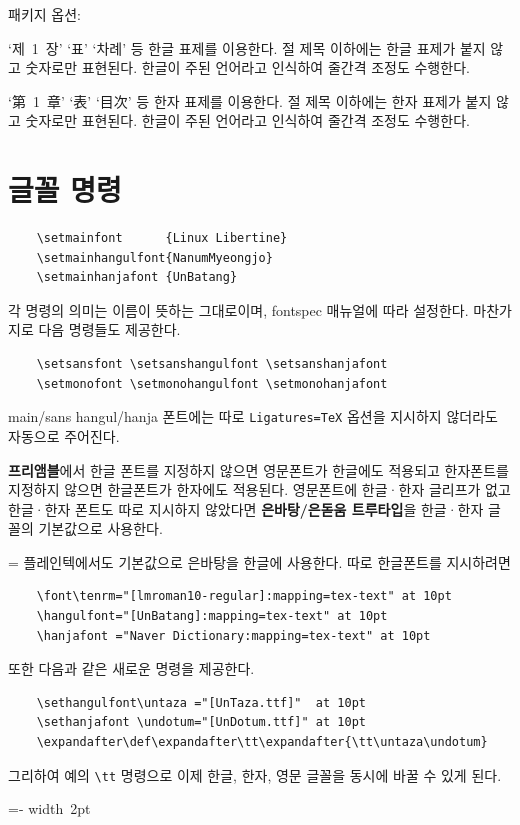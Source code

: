 \documentclass[a4paper]{article}
\def\grayvrule{{\color{white!80!black}\vrule width 2pt}}
\newenvironment{plaintex}
  {\par\medskip
    \setbox0=\vbox\bgroup\kern5pt\leftskip15pt \small
    \parindent0pt }
  {\par \kern5pt\egroup
    \dimen0=\dimexpr\pagegoal-\pagetotal\relax
    \ifdim\dimen0<\baselineskip\relax \dimen0\maxdimen \fi
    \ifdim\ht0<\dimen0
      \hbox{\grayvrule \box0}%
    \else
      \setbox2=\vsplit0 to\dimen0
      \lineskip0pt
      \ifvoid2 \else\hbox{\grayvrule \box2}\fi
      \ifvoid0 \else\hbox{\grayvrule \box0}\fi
    \fi \par\smallskip
  }
\def\cs#1{\texttt{\textbackslash #1}}
\def\hemph#1{\textsf{\bfseries #1}}
\begin{document}
패키지 옵션:
\begin{description}\hangulquotes
\item[ hangul ] `제~1~장' `표' `차례' 등 한글 표제를 이용한다.
  절 제목 이하에는 한글 표제가 붙지 않고 숫자로만 표현된다.
  한글이 주된 언어라고 인식하여 줄간격 조정도 수행한다.
\item[ hanja ]  `第~1~章' `表' `目次' 등 한자 표제를 이용한다.
  절 제목 이하에는 한자 표제가 붙지 않고 숫자로만 표현된다.
  한글이 주된 언어라고 인식하여 줄간격 조정도 수행한다.
\end{description}


\section{글꼴 명령}\label{sec:fontcmds}
\begin{verbatim}
    \setmainfont      {Linux Libertine}
    \setmainhangulfont{NanumMyeongjo}
    \setmainhanjafont {UnBatang}
\end{verbatim}
각 명령의 의미는 이름이 뜻하는 그대로이며, fontspec 매뉴얼에 따라
설정한다.  마찬가지로 다음 명령들도 제공한다.
\begin{verbatim}
    \setsansfont \setsanshangulfont \setsanshanjafont
    \setmonofont \setmonohangulfont \setmonohanjafont
\end{verbatim}
main/sans hangul/hanja 폰트에는 따로 \verb|Ligatures=TeX| 옵션을 지시하지
않더라도 자동으로 주어진다.

\hemph{프리앰블}에서 한글 폰트를 지정하지 않으면 영문폰트가 한글에도 적용되고
한자폰트를 지정하지 않으면 한글폰트가 한자에도 적용된다.
영문폰트에 한글·한자 글리프가 없고 한글·한자 폰트도 따로
지시하지 않았다면 \hemph{은바탕/은돋움 트루타입}을 한글·한자 글꼴의 기본값으로
사용한다.

\bigskip

\begin{plaintex}
플레인텍에서도 기본값으로 은바탕을 한글에 사용한다. 따로 한글폰트를 지시하려면
\begin{verbatim}
    \font\tenrm="[lmroman10-regular]:mapping=tex-text" at 10pt
    \hangulfont="[UnBatang]:mapping=tex-text" at 10pt
    \hanjafont ="Naver Dictionary:mapping=tex-text" at 10pt
\end{verbatim}
  또한 다음과 같은 새로운 명령을 제공한다.
\begin{verbatim}
    \sethangulfont\untaza ="[UnTaza.ttf]"  at 10pt
    \sethanjafont \undotum="[UnDotum.ttf]" at 10pt
    \expandafter\def\expandafter\tt\expandafter{\tt\untaza\undotum}
\end{verbatim}
  그리하여 예의 \cs{tt} 명령으로 이제 한글, 한자, 영문 글꼴을 동시에 바꿀 수 있게 된다.
\end{plaintex}
\end{document}
